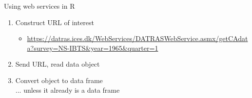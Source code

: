 \documentclass[aspectratio=169]{beamer}
\begin{document}

\begin{frame}{Using web services in R}\small
  \begin{enumerate}
    \item Construct URL of interest\\[0.5ex]
    \begin{itemize}\item[]
      \begin{minipage}{60ex}
        \setlength\parindent{-15pt}
        \scriptsize\blue\url{https://datras.ices.dk/WebServices/DATRASWebService.asmx/getCAdata?survey=NS-IBTS\&year=1965\&quarter=1}\\[3ex]
      \end{minipage}
    \end{itemize}
    \item Send URL, read data object\\[6ex]
    \item Convert object to data frame\\[0.5ex]
    \quad\gray\footnotesize ... unless it already is a data frame\\[1ex]
  \end{enumerate}
\end{frame}

\end{document}
